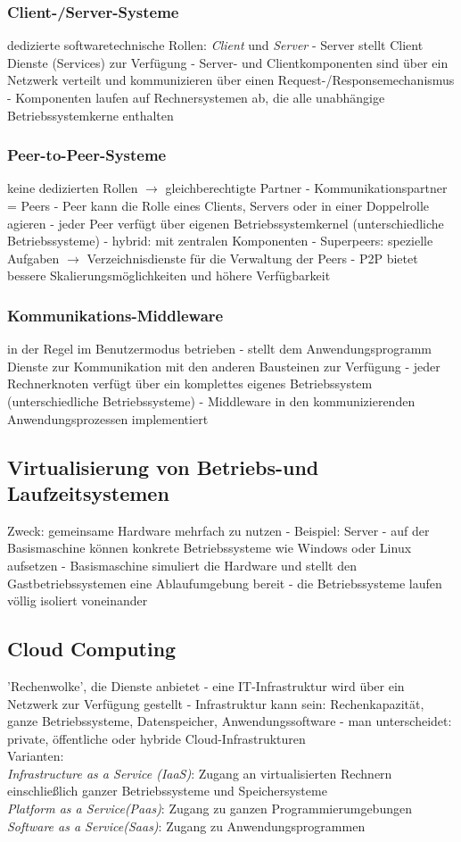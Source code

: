 \documentclass[11pt,a4paper,landscape]{article}
\begin{document}
\begin{multicols*}{3}
	\subsubsection{Client-/Server-Systeme}
	dedizierte softwaretechnische Rollen: \textit{Client} und \textit{Server} - Server stellt Client Dienste (Services) zur Verfügung - Server- und Clientkomponenten sind über ein Netzwerk verteilt und kommunizieren über einen Request-/Responsemechanismus - Komponenten laufen auf Rechnersystemen ab, die alle unabhängige Betriebssystemkerne enthalten
	\subsubsection{Peer-to-Peer-Systeme}
	keine dedizierten Rollen $\rightarrow$ gleichberechtigte Partner - Kommunikationspartner = Peers - Peer kann die Rolle eines Clients, Servers oder in einer Doppelrolle agieren - jeder Peer verfügt über eigenen Betriebssystemkernel (unterschiedliche Betriebssysteme) - hybrid: mit zentralen Komponenten - Superpeers: spezielle Aufgaben $\rightarrow$ Verzeichnisdienste für die Verwaltung der Peers - P2P bietet bessere Skalierungsmöglichkeiten und höhere Verfügbarkeit
	\subsubsection{Kommunikations-Middleware}
	in der Regel im Benutzermodus betrieben - stellt dem Anwendungsprogramm Dienste zur Kommunikation mit den anderen Bausteinen zur Verfügung - jeder Rechnerknoten verfügt über ein komplettes eigenes Betriebssystem (unterschiedliche Betriebssysteme) - Middleware in den kommunizierenden Anwendungsprozessen implementiert
	\subsection{Virtualisierung von Betriebs-und Laufzeitsystemen}
	Zweck: gemeinsame Hardware mehrfach zu nutzen - Beispiel: Server - auf der Basismaschine können konkrete Betriebssysteme wie Windows oder Linux aufsetzen - Basismaschine simuliert die Hardware und stellt den Gastbetriebssystemen eine Ablaufumgebung bereit - die Betriebssysteme laufen völlig isoliert voneinander
	\subsection{Cloud Computing}
	'Rechenwolke', die Dienste anbietet - eine IT-Infrastruktur wird über ein Netzwerk zur Verfügung gestellt - Infrastruktur kann sein: Rechenkapazität, ganze Betriebssysteme, Datenspeicher, Anwendungssoftware - man unterscheidet: private, öffentliche oder hybride Cloud-Infrastrukturen\\
	Varianten:\\
	\textit{Infrastructure as a Service (IaaS)}: Zugang an virtualisierten Rechnern einschließlich ganzer Betriebssysteme und Speichersysteme\\
	\textit{Platform as a Service(Paas)}: Zugang zu ganzen Programmierumgebungen\\
	\textit{Software as a Service(Saas)}: Zugang zu Anwendungsprogrammen

\end{multicols*}
\end{document}
